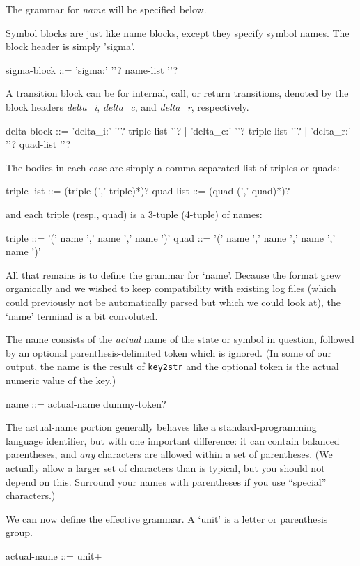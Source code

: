 The grammar for \textsl{name} will be specified below.


Symbol blocks are just like name blocks, except they specify symbol
names. The block header is simply 'sigma'.

  sigma-block  ::=  'sigma:'  '{'?  name-list  '}'?


A transition block can be for internal, call, or return transitions,
denoted by the block headers \textsl{delta\_i}, \textsl{delta\_c}, and
\textsl{delta\_r}, respectively.
 
  delta-block  ::=  'delta\_i:'  '{'?  triple-list  '}'?
                 |  'delta\_c:'  '{'?  triple-list  '}'?
                 |  'delta\_r:'  '{'?  quad-list    '}'?

The bodies in each case are simply a comma-separated list of triples
or quads:

  triple-list ::=  (triple  (','  triple)*)?
  quad-list   ::=  (quad  (','  quad)*)?

and each triple (resp., quad) is a 3-tuple (4-tuple) of names:

  triple  ::=  '('  name ','  name  ','  name  ')'
  quad  ::=  '('  name ','  name  ','  name  ','  name  ')'


All that remains is to define the grammar for `name'. Because the
format grew organically and we wished to keep compatibility with
existing log files (which could previously not be automatically parsed
but which we could look at), the `name' terminal is a bit convoluted.

The name consists of the \textsl{actual} name of the state or symbol
in question, followed by an optional parenthesis-delimited token which
is ignored. (In some of our output, the name is the result of
\texttt{key2str} and the optional token is the actual numeric value of
the key.)

  name  ::=  actual-name  dummy-token?

The actual-name portion generally behaves like a standard-programming
language identifier, but with one important difference: it can contain
balanced parentheses, and \textsl{any} characters are allowed within a
set of parentheses. (We actually allow a larger set of characters than
is typical, but you should not depend on this. Surround your names
with parentheses if you use ``special'' characters.)

We can now define the effective grammar. A `unit' is a letter or
parenthesis group.

  actual-name  ::=  unit+

